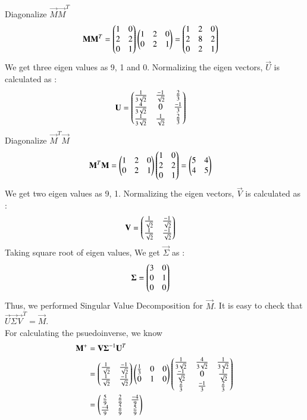 \documentclass[journal,12pt,twocolumn]{IEEEtran}
\begin{document}
Diagonalize $\vec{M}\vec{M}^T$
\begin{align}
	\mathbf{M}\mathbf{M}^T &= \begin{pmatrix}1 & 0\\2 & 2\\0 & 1\end{pmatrix} \begin{pmatrix}1 & 2 & 0\\0 & 2 & 1\end{pmatrix} = \begin{pmatrix}1 & 2 & 0\\2 & 8 & 2\\ 0 & 2 & 1\end{pmatrix} 
\end{align}
We get three eigen values as 9, 1 and 0. Normalizing the eigen vectors, $\vec{U}$ is calculated as : 
\begin{align}
	\mathbf{U} &= \begin{pmatrix}\frac{1}{3\sqrt{2}} & \frac{-1}{\sqrt{2}} & \frac{2}{3} \\ \frac{4}{3\sqrt{2}} & 0 & \frac{-1}{3} \\ \frac{1}{3\sqrt{2}} & \frac{1}{\sqrt{2}} & \frac{2}{3}\end{pmatrix}  
\end{align}
Diagonalize $\vec{M}^T\vec{M}$
\begin{align}
	\label{e14}\mathbf{M}^T\mathbf{M} &= \begin{pmatrix}1 & 2 & 0\\0 & 2 & 1\end{pmatrix}\begin{pmatrix}1 & 0\\2 & 2\\0 & 1\end{pmatrix} = \begin{pmatrix}5 & 4\\4 & 5\end{pmatrix}
\end{align}
We get two eigen values as 9, 1. Normalizing the eigen vectors, $\vec{V}$ is calculated as : 
\begin{align}
	\mathbf{V} &= \begin{pmatrix}\frac{1}{\sqrt{2}} & \frac{-1}{\sqrt{2}} \\
	\frac{1}{\sqrt{2}} & \frac{-1}{\sqrt{2}}\end{pmatrix}  
\end{align}
Taking square root of eigen values, We get $\vec{\Sigma}$ as :
\begin{align}
	\mathbf{\Sigma} &= \begin{pmatrix}3 & 0\\0 & 1\\0 & 0\end{pmatrix}
\end{align}
Thus, we performed Singular Value Decomposition for $\vec{M}$. It is easy to check that $\vec{U}\vec{\Sigma}\vec{V}^T = \vec{M}$. \\
For calculating the psuedoinverse, we know 
\begin{align}
\mathbf{M}^{+} &= \mathbf{V}\mathbf{\Sigma}^{-1}\mathbf{U}^T \\
&= \begin{pmatrix}\frac{1}{\sqrt{2}} & \frac{-1}{\sqrt{2}} \\
	\frac{1}{\sqrt{2}} & \frac{-1}{\sqrt{2}}\end{pmatrix} \begin{pmatrix}\frac{1}{3} & 0 & 0 \\ 0 & 1 & 0\end{pmatrix} \begin{pmatrix}\frac{1}{3\sqrt{2}} & \frac{4}{3\sqrt{2}} & \frac{1}{3\sqrt{2}} \\ \frac{-1}{\sqrt{2}} & 0 &  \frac{1}{\sqrt{2}} \\  \frac{2}{3} & \frac{-1}{3} & \frac{2}{3}\end{pmatrix}\\
&= \label{eq7}\begin{pmatrix}\frac{5}{9} & \frac{2}{9} & \frac{-4}{9} \\ \frac{-4}{9} & \frac{2}{9} & \frac{5}{9}\end{pmatrix}
\end{align}
\end{document}
